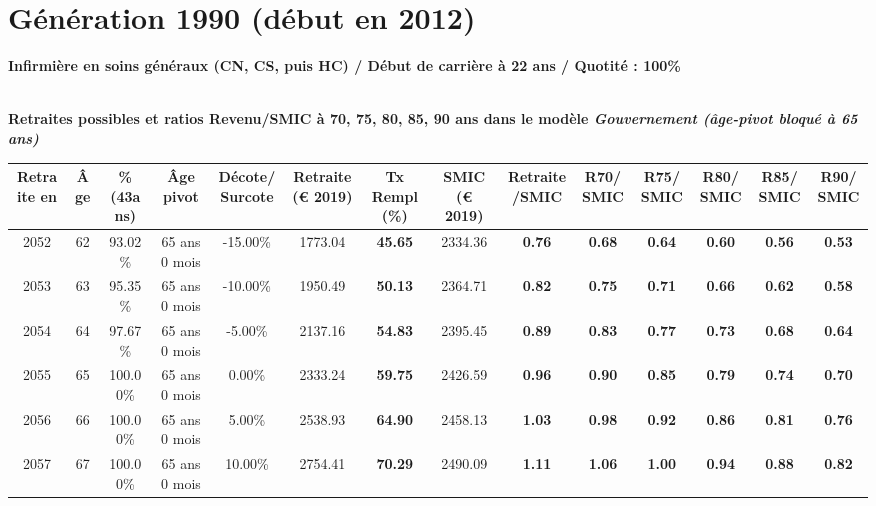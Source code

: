 \newpage 
 
\section{Génération 1990 (début en 2012)\label{Infirmier_100_22_1990_0}} 
 
{\bf \noindent Infirmière en soins généraux (CN, CS, puis HC) / Début de carrière à 22 ans / Quotité : 100\%}  ~ 

 ~\\{\bf \noindent Retraites possibles et ratios Revenu/SMIC à 70, 75, 80, 85, 90 ans dans le modèle \emph{Gouvernement (âge-pivot bloqué à 65 ans)}}  
 
\begin{adjustbox}{max width=\textwidth} 
\begin{tabular}[htb]{|c|c||c|c|c||c|c||c|c||c|c|c|c|c|} 
\hline 
 Retraite en &  Âge &  \%(43ans) &  Âge pivot &  Décote/Surcote &  Retraite (\euro{} 2019) &  Tx Rempl(\%) &  SMIC (\euro{} 2019) &  Retraite/SMIC &  R70/SMIC &  R75/SMIC &  R80/SMIC &  R85/SMIC &  R90/SMIC \\ 
\hline \hline 
 2052 &  62 &  93.02\% &  65 ans 0 mois &  -15.00\% &  1773.04 &  {\bf 45.65} &  2334.36 &  {\bf {\color{red} 0.76}} &  {\bf {\color{red} 0.68}} &  {\bf {\color{red} 0.64}} &  {\bf {\color{red} 0.60}} &  {\bf {\color{red} 0.56}} &  {\bf {\color{red} 0.53}} \\ 
\hline 
 2053 &  63 &  95.35\% &  65 ans 0 mois &  -10.00\% &  1950.49 &  {\bf 50.13} &  2364.71 &  {\bf {\color{red} 0.82}} &  {\bf {\color{red} 0.75}} &  {\bf {\color{red} 0.71}} &  {\bf {\color{red} 0.66}} &  {\bf {\color{red} 0.62}} &  {\bf {\color{red} 0.58}} \\ 
\hline 
 2054 &  64 &  97.67\% &  65 ans 0 mois &  -5.00\% &  2137.16 &  {\bf 54.83} &  2395.45 &  {\bf {\color{red} 0.89}} &  {\bf {\color{red} 0.83}} &  {\bf {\color{red} 0.77}} &  {\bf {\color{red} 0.73}} &  {\bf {\color{red} 0.68}} &  {\bf {\color{red} 0.64}} \\ 
\hline 
 2055 &  65 &  100.00\% &  65 ans 0 mois &  0.00\% &  2333.24 &  {\bf 59.75} &  2426.59 &  {\bf {\color{red} 0.96}} &  {\bf {\color{red} 0.90}} &  {\bf {\color{red} 0.85}} &  {\bf {\color{red} 0.79}} &  {\bf {\color{red} 0.74}} &  {\bf {\color{red} 0.70}} \\ 
\hline 
 2056 &  66 &  100.00\% &  65 ans 0 mois &  5.00\% &  2538.93 &  {\bf 64.90} &  2458.13 &  {\bf 1.03} &  {\bf {\color{red} 0.98}} &  {\bf {\color{red} 0.92}} &  {\bf {\color{red} 0.86}} &  {\bf {\color{red} 0.81}} &  {\bf {\color{red} 0.76}} \\ 
\hline 
 2057 &  67 &  100.00\% &  65 ans 0 mois &  10.00\% &  2754.41 &  {\bf 70.29} &  2490.09 &  {\bf 1.11} &  {\bf 1.06} &  {\bf {\color{red} 1.00}} &  {\bf {\color{red} 0.94}} &  {\bf {\color{red} 0.88}} &  {\bf {\color{red} 0.82}} \\ 
\hline 
\hline 
\end{tabular} 
\end{adjustbox} 
 
